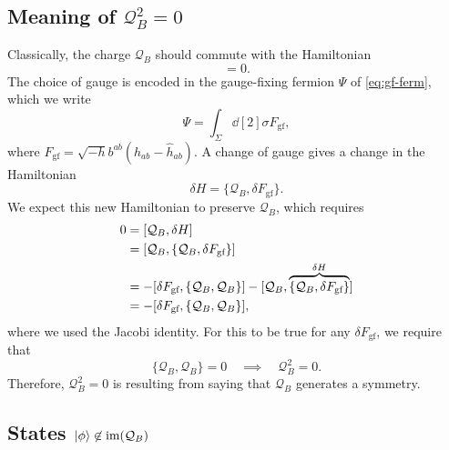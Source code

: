 
\subsection*{Meaning of $\mathcal{Q}_B^2 = 0$}%

Classically, the charge $\mathcal{Q}_B$ should commute with the Hamiltonian
\begin{equation}
  [\mathcal{Q}_B, H] = 0.
\end{equation}
The choice of gauge is encoded in the gauge-fixing fermion $\Psi$ of \eqref{eq:gf-ferm}, which we write
\begin{equation}
  \Psi = \int_{\Sigma} \dd[2]{\sigma} F_{\text{gf}},
\end{equation}
where $F_{\text{gf}} = \sqrt{-h} b^{ab} (h_{ab} - \hat{h}_{ab})$.
A change of gauge gives a change in the Hamiltonian
\begin{equation}
  \delta H = \{\mathcal{Q}_B, \delta F_{\text{gf}}\}.
\end{equation}
We expect this new Hamiltonian to preserve $\mathcal{Q}_B$, which requires
\begin{align}
  0 &= [\mathcal{Q}_B, \delta H] \\
    &= [\mathcal{Q}_B, \{\mathcal{Q}_B, \delta F_{\text{gf}}\}] \\
    &= - [\delta F_{\text{gf}}, \{\mathcal{Q}_B, \mathcal{Q}_B\}] - [\mathcal{Q}_B, \overbrace{\{\mathcal{Q}_B, \delta F_{\text{gf}}\}}^{\mathclap{\delta H}}] \\
    &= - [\delta F_{\text{gf}}, \{\mathcal{Q}_B, \mathcal{Q}_B\}],
\end{align}
where we used the Jacobi identity.
For this to be true for any $\delta F_{\text{gf}}$, we require that 
\begin{equation}
  \{\mathcal{Q}_B, \mathcal{Q}_B\} = 0 \quad \implies \quad \boxed{\mathcal{Q}_B^2 = 0}.
\end{equation}
Therefore, $\mathcal{Q}_B^2 = 0$ is resulting from saying that $\mathcal{Q}_B$ generates a symmetry.

\subsection*{States $\ket{\phi} \not\in \text{im}(\mathcal{Q}_B)$}%

